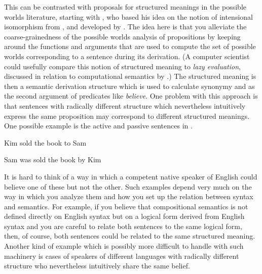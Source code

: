 This can be contrasted with proposals for structured meanings in the
possible worlds literature, starting with \cite{Lewis1972}, who based
his idea on the notion of intensional isomorphism from
\cite{Carnap1956}, and developed by \cite{Cresswell1985}.  The idea
here is that you alleviate the coarse-grainedness of the possible
worlds analysis of propositions by keeping around the functions and
arguments that are used to compute the set of possible worlds
corresponding to a sentence during its derivation.  (A computer
scientist could usefully compare this notion of structured meaning to
\textit{lazy evaluation}, discussed in relation to computational
semantics by \citealp{EijckUnger2010}.)  The structured meaning is
then a semantic derivation structure which is used to calculate
synonymy and as the second argument of predicates like
\textit{believe}.  One problem with this approach is that sentences
with radically different structure which nevertheless intuitively
express the same proposition may correspond to different structured
meanings.  One possible example is the active and passive sentences
in \nexteg{}.
\begin{ex} 
\begin{subex} 
 
\item Kim sold the book to Sam 
 
\item Sam was sold the book by Kim 
 
\end{subex} 
   
\end{ex} 
It is hard to think of a way in which a competent native speaker of
English could believe one of these but not the other.  Such examples
depend very much on the way in which you analyze them and how you set
up the relation between syntax and semantics.  For example, if you
believe that compositional semantics is not defined directly on
English syntax but on a logical form derived from English syntax and
you are careful to relate both sentences to the same logical form,
then, of course, both sentences could be related to the same
structured meaning.  Another kind of example which is possibly more
difficult to handle with such machinery is cases of speakers of
different languages with radically different structure who
nevertheless intuitively share the same belief.

